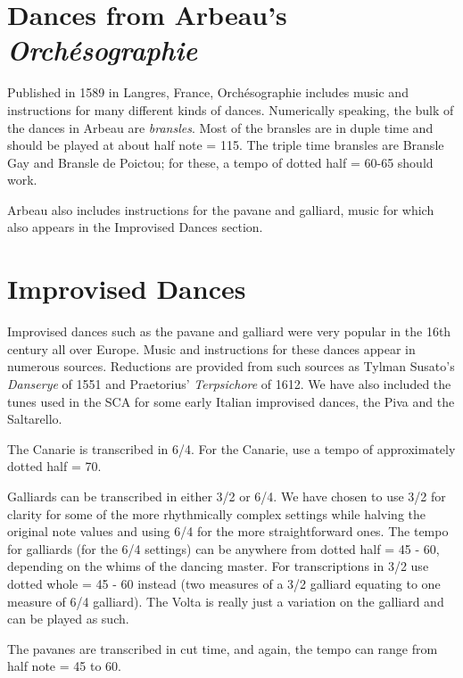 \documentclass[11pt]{book}
\begin{document}
\clearpage


\chapter{Dances from Arbeau's {\em Orchésographie}}

Published in 1589 in Langres, France, Orchésographie includes music and
instructions for many different kinds of dances. Numerically speaking, the bulk
of the dances in Arbeau are {\em bransles}. Most of the bransles are in duple
time and should be played at about half note = 115.  The triple time bransles
are Bransle Gay and Bransle de Poictou; for these, a tempo of dotted half =
60-65 should work.

Arbeau also includes instructions for the pavane and galliard, music for which
also appears in the Improvised Dances section.

\clearpage


\chapter{Improvised Dances}

Improvised dances such as the pavane and galliard were very popular in the 16th
century all over Europe. Music and instructions for these dances appear in
numerous sources. Reductions are provided from such sources as Tylman Susato's
{\em Danserye} of 1551 and Praetorius' {\em Terpsichore} of 1612. We have also
included the tunes used in the SCA for some early Italian improvised dances,
the Piva and the Saltarello.

The Canarie is transcribed in 6/4. For the Canarie, use a tempo of
approximately dotted half = 70.

Galliards can be transcribed in either 3/2 or 6/4. We have chosen to use 3/2
for clarity for some of the more rhythmically complex settings while halving
the original note values and using 6/4 for the more straightforward ones. The
tempo for galliards (for the 6/4 settings) can be anywhere from dotted half =
45 - 60, depending on the whims of the dancing master. For transcriptions in
3/2 use dotted whole = 45 - 60 instead (two measures of a 3/2 galliard equating
to one measure of 6/4 galliard). The Volta is really just a variation on the
galliard and can be played as such.

The pavanes are transcribed in cut time, and again, the tempo can range from
half note = 45 to 60.
\end{document}
